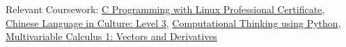 \documentclass[
]{article}
\begin{document}
Relevant Coursework: 
 \href{https://credentials.edx.org/credentials/1782d3571b2945de9b421230968ace62/}{C Programming with Linux Professional Certificate},
 \href{https://courses.edx.org/certificates/675cc428e361416088f6761ff6003cc1}{Chinese Language in Culture: Level 3}, 
\href{https://credentials.edx.org/credentials/de5d12ed05c8442e8b4c238fe2330132/}{Computational Thinking using Python},
 \href{https://courses.edx.org/certificates/427a45b7df034c2a9fb085b0993bdec0}{Multivariable Calculus 1: Vectors and Derivatives} 








\end{document}
